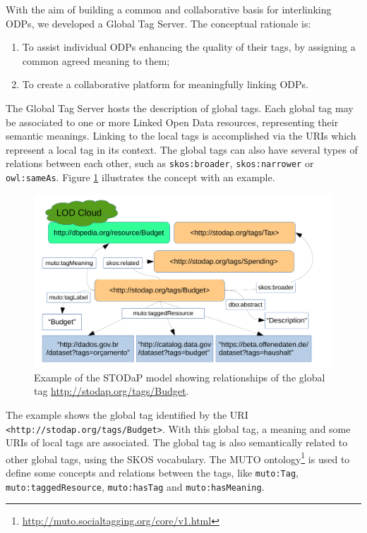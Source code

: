 
With the aim of building a common and collaborative basis for interlinking ODPs, we developed a Global Tag Server.
The conceptual rationale is:
\begin{enumerate}
	\item To assist individual ODPs enhancing the quality of their tags, by assigning a common agreed meaning to them;
	\item To create a collaborative platform for meaningfully linking ODPs.
\end{enumerate}

The Global Tag Server hosts the description of global tags.
Each global tag may be associated to one or more Linked Open Data resources, representing their semantic meanings.
Linking to the local tags is accomplished via the URIs which represent a local tag in its context.
The global tags can also have several types of relations between each other, such as \texttt{skos:broader}, \texttt{skos:narrower} or \texttt{owl:sameAs}.
Figure \ref{fig:example} illustrates the concept with an example.

\begin{figure}[tb]
\begin{center}
\includegraphics[scale=.7]{images/example.pdf}
\caption{Example of the STODaP model showing relationships of the global tag \url{http://stodap.org/tags/Budget}.}
\label{fig:example}
\end{center}
\end{figure}

The example shows the global tag identified by the URI \texttt{<http://stodap.org/tags/Budget>}. 
With this global tag, a meaning and some URIs of local tags are associated.
The global tag is also semantically related to other global tags, using the SKOS vocabulary.
The MUTO ontology\footnote{\url{http://muto.socialtagging.org/core/v1.html}} is used to define some concepts and relations between the tags, like \texttt{muto:Tag}, \texttt{muto:taggedResource}, \texttt{muto:hasTag} and \texttt{muto:hasMeaning}.

